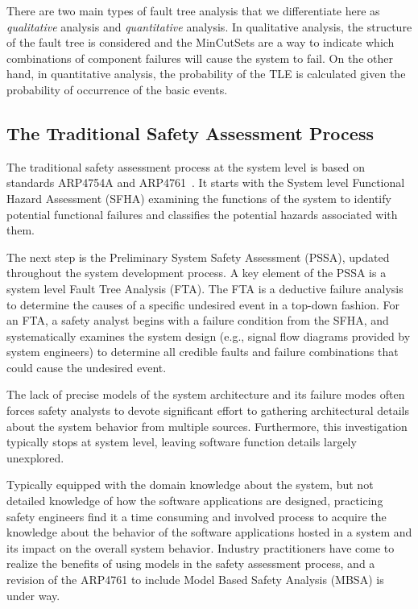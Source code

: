 There are two main types of fault tree analysis that we differentiate here as \textit{qualitative} analysis and \textit{quantitative} analysis. In qualitative analysis, the structure of the fault tree is considered and the MinCutSets are a way to indicate which combinations of component failures will cause the system to fail. On the other hand, in quantitative analysis, the probability of the TLE is calculated given the probability of occurrence of the basic events. 

\subsection{The Traditional Safety Assessment Process}
\label{sec:saProcess}
The traditional safety assessment process at the system level is based on standards ARP4754A and ARP4761~\cite{SAE:ARP4754A,SAE:ARP4761}. It starts with the System level Functional Hazard Assessment (SFHA) examining the functions of the system to identify potential functional failures and classifies the potential hazards associated with them. 

The next step is the Preliminary System Safety Assessment (PSSA), updated throughout the system development process. A key element of the PSSA is a system level Fault Tree Analysis (FTA).  The FTA is a deductive failure analysis to determine the causes of a specific undesired event in a top-down fashion. For an FTA, a safety analyst begins with a failure condition from the SFHA, and systematically examines the system design (e.g., signal flow diagrams provided by system engineers) to determine all credible faults and failure combinations that could cause the undesired event. 

The lack of precise models of the system architecture and its failure modes often forces safety analysts to devote significant effort to gathering architectural details about the system behavior from multiple sources. Furthermore, this investigation typically stops at system level, leaving software function details largely unexplored.

Typically equipped with the domain knowledge about the system, but not detailed knowledge of how the software applications are designed, practicing safety engineers find it a time consuming and involved process to acquire the knowledge about the behavior of the software applications hosted in a system and its impact on the overall system behavior.
Industry practitioners have come to realize the benefits of using models in the safety assessment process, and a revision of the ARP4761 to include Model Based Safety Analysis (MBSA) is under way. %

